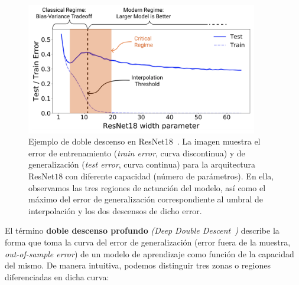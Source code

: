 \begin{figure}[h]
    \centering
    \includegraphics[width=0.9\textwidth]{img/problem-definition.png}
    \caption[Ejemplo de doble descenso profundo en ResNet$18$~\cite{Nakkiran2019}.] {Ejemplo de doble descenso en ResNet18~\cite{Nakkiran2019}. La imagen muestra el error de entrenamiento (\textit{train error}, curva discontinua) y de generalización (\textit{test error}, curva continua) para la arquitectura ResNet$18$ con diferente capacidad (número de parámetros). En ella, observamos las tres regiones de actuación del modelo, así como el máximo del error de generalización correspondiente al umbral de interpolación y los dos descensos de dicho error.}\label{fig:ejemplo-definicion-double-descent}
\end{figure}

El término \textbf{doble descenso profundo} \emph{(Deep Double Descent~\cite{Belkin2019})} describe la forma que toma la curva del error de generalización (error fuera de la muestra, \textit{out-of-sample error}) de un modelo de aprendizaje como función de la capacidad del mismo. De manera intuitiva, podemos distinguir tres zonas o regiones diferenciadas en dicha curva:

